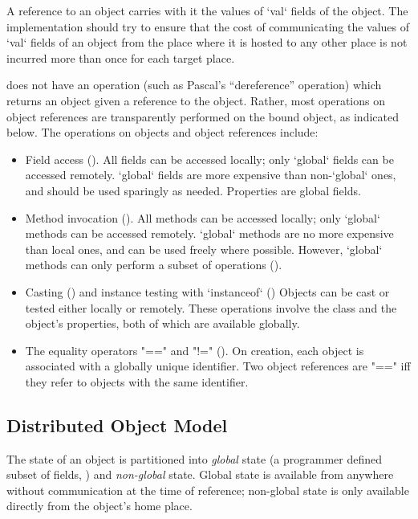 A reference to an object carries with it the values of   \xcd`val`
fields 
of the object. The implementation should try to ensure that the cost
of communicating the values of \xcd`val` fields of an object from the
place where it is hosted to any other place is not incurred more than
once for each target place.

{}\Xten{} does not have an operation (such as Pascal's ``dereference''
operation) which returns an object given a reference to the
object. Rather, most operations on object references are transparently
performed on the bound object, as indicated below. The operations on
objects and object references include:
\begin{itemize}

{}\item Field access (). 
All fields can be accessed locally; only \xcd`global` fields can be accessed
remotely.   \xcd`global` fields are more expensive than non-\xcd`global` ones,
and should be used sparingly as needed.  Properties are global fields.

{}\item Method invocation ().  
\label{GlobalAnnotation}
All methods can be accessed locally; only \xcd`global` methods can be accessed
remotely.  \xcd`global` methods are no more expensive than local ones, and can
be used freely where possible.  However, \xcd`global` methods can only perform
a subset of operations ().

{}\item Casting () and instance testing with \xcd`instanceof`
() Objects can be cast or tested either locally or remotely.
These operations involve the class and the object's properties, both of which
are available globally.

\item The equality operators \xcd"==" and \xcd"!="
(). On creation, each object is associated with a globally
unique identifier. Two object references are \xcd"==" iff they refer to objects
with the same identifier.

\end{itemize}

\subsection{Distributed Object Model}

The state of an object is partitioned into \emph{global} state (a
programmer defined subset of  fields, ) and
\emph{non-global} state.  Global state is available from anywhere without
communication at the time of reference; non-global state is only available
directly from the object's home place. 

